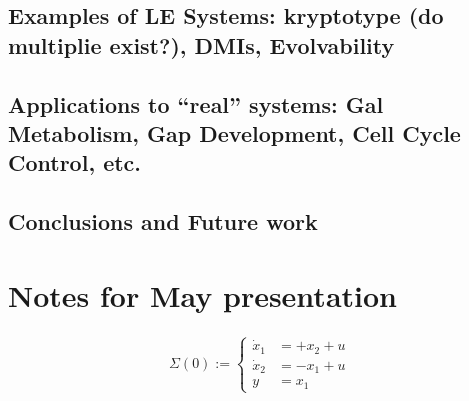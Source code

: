 \documentclass[11 pt]{article}
\newcommand{\1}{\mathbbm{1}}
\begin{document}
     \subsection{Examples of LE Systems: kryptotype (do multiplie exist?), DMIs, Evolvability}

     \subsection{Applications to ``real'' systems: Gal Metabolism, Gap Development, Cell Cycle Control, etc.}

     \subsection{Conclusions and Future work}

     \section{Notes for May presentation}
    \begin{align*}
      \Sigma(0) := \left\{ \begin{array}{ll}
      \dot{x}_{1} &= +x_{2} + u \\
      \dot{x}_{2} &= -x_{1} + u \\
      y &= x_{1}
      \end{array} \right.
    \end{align*}
\newpage
\end{document}
